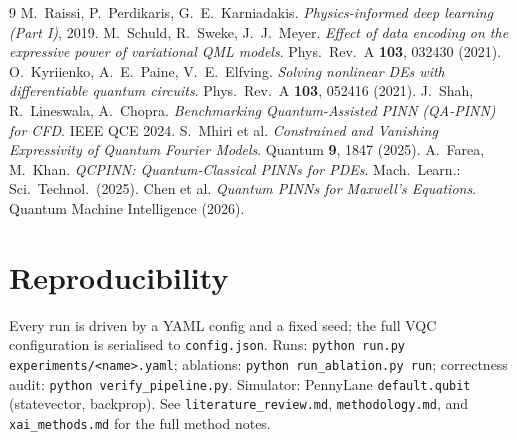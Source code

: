 \documentclass[11pt]{article}
\begin{document}
\begin{thebibliography}{9}
\small
{} M.~Raissi, P.~Perdikaris, G.~E.~Karniadakis.
  \emph{Physics-informed deep learning (Part I)}, 2019.
 M.~Schuld, R.~Sweke, J.~J.~Meyer.
  \emph{Effect of data encoding on the expressive power of variational QML models}.
  Phys.\ Rev.\ A \textbf{103}, 032430 (2021).
 O.~Kyriienko, A.~E.~Paine, V.~E.~Elfving.
  \emph{Solving nonlinear DEs with differentiable quantum circuits}.
  Phys.\ Rev.\ A \textbf{103}, 052416 (2021).
 J.~Shah, R.~Lineswala, A.~Chopra.
  \emph{Benchmarking Quantum-Assisted PINN (QA-PINN) for CFD}. IEEE QCE 2024.
 S.~Mhiri et al.
  \emph{Constrained and Vanishing Expressivity of Quantum Fourier Models}.
  Quantum \textbf{9}, 1847 (2025).
 A.~Farea, M.~Khan.
  \emph{QCPINN: Quantum-Classical PINNs for PDEs}. Mach.\ Learn.: Sci.\ Technol.\ (2025).
 Chen et al.
  \emph{Quantum PINNs for Maxwell's Equations}. Quantum Machine Intelligence (2026).
\end{thebibliography}

\appendix
\section{Reproducibility}
Every run is driven by a YAML config and a fixed seed; the full VQC configuration
is serialised to \texttt{config.json}. Runs: \texttt{python run.py
experiments/<name>.yaml}; ablations: \texttt{python run\_ablation.py run};
correctness audit: \texttt{python verify\_pipeline.py}. Simulator:
PennyLane \texttt{default.qubit} (statevector, backprop). See \texttt{literature\_review.md},
\texttt{methodology.md}, and \texttt{xai\_methods.md} for the full method notes.
\end{document}
